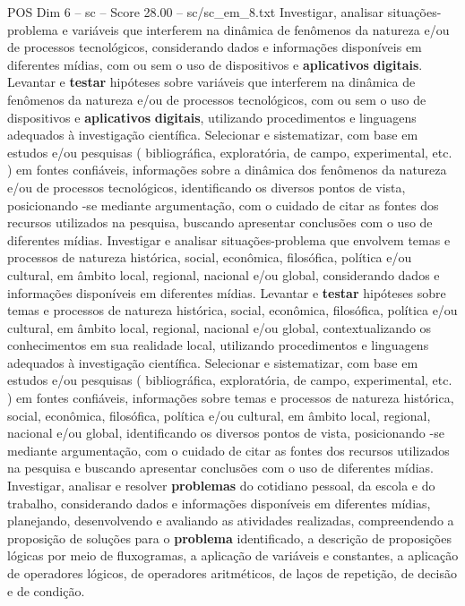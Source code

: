 \begin{textsample}{POS Dim 6 – sc – Score 28.00 – sc/sc\_em\_8.txt}
Investigar, analisar situações-problema e variáveis que interferem na dinâmica de fenômenos da natureza e/ou de processos tecnológicos, considerando dados e informações disponíveis em diferentes mídias, com ou sem o uso de dispositivos e \textbf{aplicativos} \textbf{digitais}.
Levantar e \textbf{testar} hipóteses sobre variáveis que interferem na dinâmica de fenômenos da natureza e/ou de processos tecnológicos, com ou sem o uso de dispositivos e \textbf{aplicativos} \textbf{digitais}, utilizando procedimentos e linguagens adequados à investigação científica.
Selecionar e sistematizar, com base em estudos e/ou pesquisas ( bibliográfica, exploratória, de campo, experimental, etc. ) em fontes confiáveis, informações sobre a dinâmica dos fenômenos da natureza e/ou de processos tecnológicos, identificando os diversos pontos de vista, posicionando -se mediante argumentação, com o cuidado de citar as fontes dos recursos utilizados na pesquisa, buscando apresentar conclusões com o uso de diferentes mídias.
Investigar e analisar situações-problema que envolvem temas e processos de natureza histórica, social, econômica, filosófica, política e/ou cultural, em âmbito local, regional, nacional e/ou global, considerando dados e informações disponíveis em diferentes mídias.
Levantar e \textbf{testar} hipóteses sobre temas e processos de natureza histórica, social, econômica, filosófica, política e/ou cultural, em âmbito local, regional, nacional e/ou global, contextualizando os conhecimentos em sua realidade local, utilizando procedimentos e linguagens adequados à investigação científica.
Selecionar e sistematizar, com base em estudos e/ou pesquisas ( bibliográfica, exploratória, de campo, experimental, etc. ) em fontes confiáveis, informações sobre temas e processos de natureza histórica, social, econômica, filosófica, política e/ou cultural, em âmbito local, regional, nacional e/ou global, identificando os diversos pontos de vista, posicionando -se mediante argumentação, com o cuidado de citar as fontes dos recursos utilizados na pesquisa e buscando apresentar conclusões com o uso de diferentes mídias.
Investigar, analisar e resolver \textbf{problemas} do cotidiano pessoal, da escola e do trabalho, considerando dados e informações disponíveis em diferentes mídias, planejando, desenvolvendo e avaliando as atividades realizadas, compreendendo a proposição de soluções para o \textbf{problema} identificado, a descrição de proposições lógicas por meio de fluxogramas, a aplicação de variáveis e constantes, a aplicação de operadores lógicos, de operadores aritméticos, de laços de repetição, de decisão e de condição.

\end{textsample}

